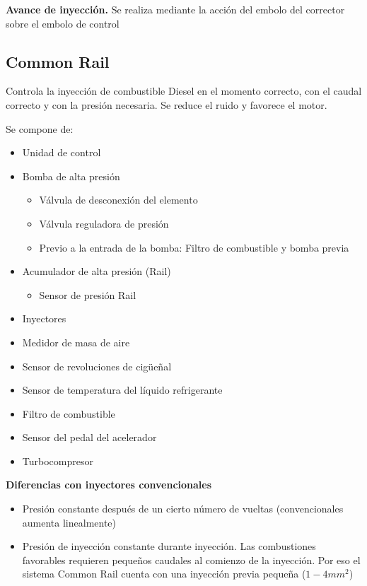 {\bf Avance de inyección.} 
Se realiza mediante la acción del embolo del corrector sobre el embolo de control

\subsection{Common Rail}
Controla la inyección de combustible Diesel en el momento correcto, con el caudal correcto y con la presión necesaria. Se reduce el ruido y favorece el motor.

Se compone de:
\begin{itemize}
    \item Unidad de control
\item Bomba de alta presión
\begin{itemize}
    \item Válvula de desconexión del elemento
    \item Válvula reguladora de presión
    \item Previo a la entrada de la bomba: Filtro de combustible y bomba previa
\end{itemize}
\item Acumulador de alta presión (Rail)
\begin{itemize}
    \item Sensor de presión Rail
\end{itemize}
\item Inyectores
\item Medidor de masa de aire
\item Sensor de revoluciones de cigüeñal
\item Sensor de temperatura del líquido refrigerante
\item Filtro de combustible
\item Sensor del pedal del acelerador
\item Turbocompresor
\end{itemize}

{\bf Diferencias con inyectores convencionales}
\begin{itemize}
    \item Presión constante después de un cierto número de vueltas (convencionales aumenta linealmente)
    \item Presión de inyección constante durante inyección. Las combustiones favorables requieren pequeños caudales al comienzo de la inyección. Por eso el sistema Common Rail cuenta con una inyección previa pequeña ($1-4\si{mm^2}$)
\end{itemize}

